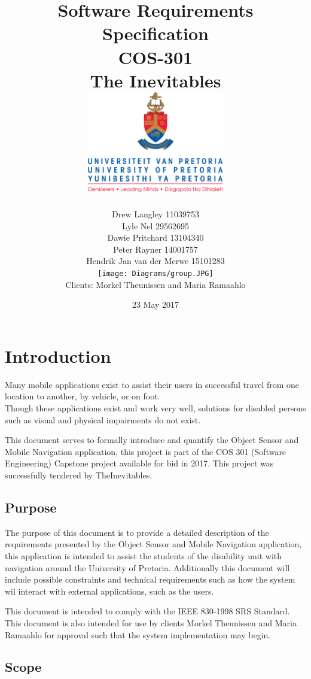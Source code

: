 \documentclass{article}
\title{ Software Requirements Specification \\ COS-301 \\ The Inevitables \\[0.5cm] \includegraphics[width=6cm]{front-page}}
\author{Drew Langley \hfill 11039753 \\ Lyle Nel \hfill 29562695 \\ Dawie Pritchard \hfill 13104340 \\  Peter Rayner \hfill 14001757\\ Hendrik Jan van der Merwe \hfill 15101283 \\ [1cm]\texttt{[image: Diagrams/group.JPG]}\\ [1cm] Clients: Morkel Theunissen and Maria Ramaahlo }
\date{23 May 2017}
\begin{document}
\maketitle
\pagebreak
\tableofcontents
\pagebreak


\section{Introduction}
		Many mobile applications exist to assist their users in successful travel from one location to another, by vehicle, or on foot. \\
		Though these applications exist and work very well, solutions for disabled persons such as visual and physical impairments do not exist.\\ \par
		This document serves to formally introduce and quantify the Object Sensor and Mobile Navigation application, this project is part of the COS 301 (Software Engineering) Capstone project available for bid in 2017. This project was successfully tendered by TheInevitables.
	
	\subsection{Purpose}
		The purpose of this document is to provide a detailed description of the requirements presented by the Object Sensor and Mobile Navigation application, this application is intended to assist the students of the disability unit with navigation around the University of Pretoria. Additionally this document will include possible constraints and technical requirements such as how the system wil interact with external applications, such as the users. \par
		This document is intended to comply with the IEEE 830-1998 SRS Standard. This document is also intended for use by clients Morkel Theunissen and Maria Ramaahlo for approval such that the system implementation may begin.
		
	\subsection{Scope}
\end{document}
